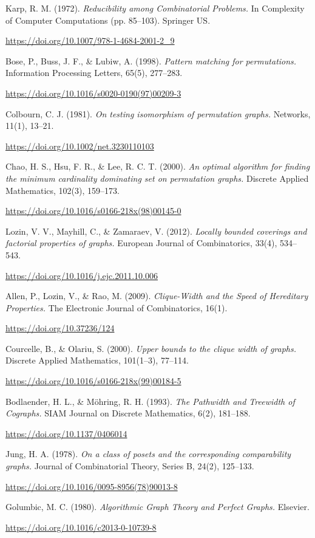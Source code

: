 \begin{thebibliography}{99}
     Karp, R. M. (1972).
    \textit{Reducibility among Combinatorial Problems. }
    In Complexity of Computer Computations (pp. 85–103). Springer US.

    \url{https://doi.org/10.1007/978-1-4684-2001-2_9}

     Bose, P., Buss, J. F., \& Lubiw, A. (1998).
    \textit{Pattern matching for permutations.}
    Information Processing Letters, 65(5), 277–283.

    \url{https://doi.org/10.1016/s0020-0190(97)00209-3}

     Colbourn, C. J. (1981).
    \textit{On testing isomorphism of permutation graphs.}
    Networks, 11(1), 13–21.

    \url{https://doi.org/10.1002/net.3230110103}

     Chao, H. S., Hsu, F. R., \& Lee, R. C. T. (2000).
    \textit{An optimal algorithm for finding the minimum cardinality dominating set on permutation graphs.}
    Discrete Applied Mathematics, 102(3), 159–173.

    \url{https://doi.org/10.1016/s0166-218x(98)00145-0}

     Lozin, V. V., Mayhill, C., \& Zamaraev, V. (2012).
    \textit{Locally bounded coverings and factorial properties of graphs.}
    European Journal of Combinatorics, 33(4), 534–543.

    \url{https://doi.org/10.1016/j.ejc.2011.10.006}

     Allen, P., Lozin, V., \& Rao, M. (2009).
    \textit{Clique-Width and the Speed of Hereditary Properties.}
    The Electronic Journal of Combinatorics, 16(1).

    \url{https://doi.org/10.37236/124}

     Courcelle, B., \& Olariu, S. (2000).
    \textit{Upper bounds to the clique width of graphs.}
    Discrete Applied Mathematics, 101(1–3), 77–114.

    \url{https://doi.org/10.1016/s0166-218x(99)00184-5}

     Bodlaender, H. L., \& Möhring, R. H. (1993).
    \textit{The Pathwidth and Treewidth of Cographs.}
    SIAM Journal on Discrete Mathematics, 6(2), 181–188.

    \url{https://doi.org/10.1137/0406014}

     Jung, H. A. (1978).
    \textit{On a class of posets and the corresponding comparability graphs.}
    Journal of Combinatorial Theory, Series B, 24(2), 125–133.

    \url{https://doi.org/10.1016/0095-8956(78)90013-8}

     Golumbic, M. C. (1980).
    \textit{Algorithmic Graph Theory and Perfect Graphs.}
    Elsevier.

    \url{https://doi.org/10.1016/c2013-0-10739-8}

\end{thebibliography}
